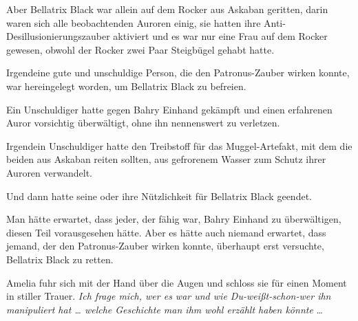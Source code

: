 Aber Bellatrix Black war allein auf dem Rocker aus Askaban geritten, darin waren sich alle beobachtenden Auroren einig, sie hatten ihre Anti-Desillusionierungszauber aktiviert und es war nur eine Frau auf dem Rocker gewesen, obwohl der Rocker zwei Paar Steigbügel gehabt hatte.

Irgendeine gute und unschuldige Person, die den Patronus-Zauber wirken konnte, war hereingelegt worden, um Bellatrix Black zu befreien.

Ein Unschuldiger hatte gegen Bahry Einhand gekämpft und einen erfahrenen Auror vorsichtig überwältigt, ohne ihn nennenswert zu verletzen.

Irgendein Unschuldiger hatte den Treibstoff für das Muggel-Artefakt, mit dem die beiden aus Askaban reiten sollten, aus gefrorenem Wasser zum Schutz ihrer Auroren verwandelt.

Und dann hatte seine oder ihre Nützlichkeit für Bellatrix Black geendet.

Man hätte erwartet, dass jeder, der fähig war, Bahry Einhand zu überwältigen, diesen Teil vorausgesehen hätte. Aber es hätte auch niemand erwartet, dass jemand, der den Patronus-Zauber wirken konnte, überhaupt erst versuchte, Bellatrix Black zu retten.

Amelia fuhr sich mit der Hand über die Augen und schloss sie für einen Moment in stiller Trauer. \emph{Ich frage mich, wer es war und wie Du-weißt-schon-wer ihn manipuliert hat … welche Geschichte man ihm wohl erzählt haben könnte} …

